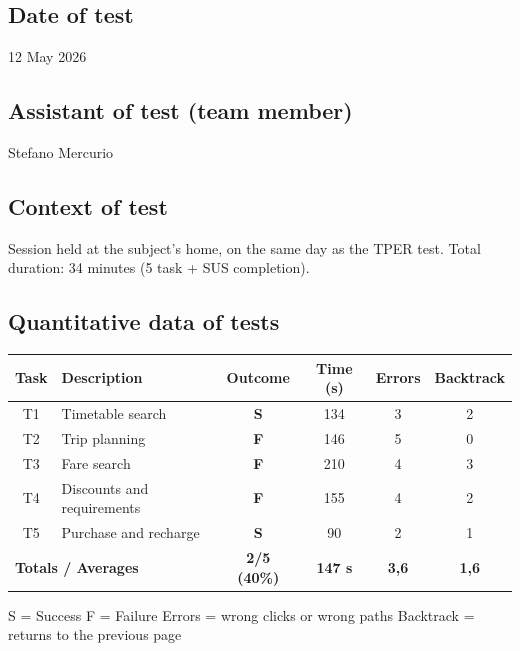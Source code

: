 ﻿\documentclass[11pt,a4paper]{article}
\begin{document}
\subsection*{Date of test}
\begin{tcolorbox}[base]
12 May 2026
\end{tcolorbox}

\subsection*{Assistant of test (team member)}
\begin{tcolorbox}[base]
Stefano Mercurio
\end{tcolorbox}

\subsection*{Context of test}
\begin{tcolorbox}[base]
Session held at the subject's home, on the same day as the TPER test. Total duration: 34 minutes (5 task +
SUS completion).
\end{tcolorbox}

\subsection*{Quantitative data of tests}
\begin{tcolorbox}[base]
\begin{center}
\renewcommand{\arraystretch}{1.4}
\begin{tabular}{clcccc}
\toprule
\textbf{Task} & \textbf{Description} &
\textbf{Outcome} & \textbf{Time (s)} &
\textbf{Errors} & \textbf{Backtrack} \\
\midrule
T1 & Timetable search             & \textbf{S} & 134 & 3 & 2 \\
T2 & Trip planning & \textbf{F} & 146 & 5 & 0 \\
T3 & Fare search           & \textbf{F} & 210 & 4 & 3 \\
T4 & Discounts and requirements  & \textbf{F} & 155 & 4 & 2 \\
T5 & Purchase and recharge       & \textbf{S} & 90 & 2 & 1 \\
\midrule
\multicolumn{2}{l}{\textbf{Totals / Averages}} &
\textbf{2/5 (40\%)} & \textbf{147 s} &
\textbf{3,6} & \textbf{1,6} \\
\bottomrule
\end{tabular}
\end{center}
\vspace{0.3cm}
\small S = Success \quad F = Failure \quad
Errors = wrong clicks or wrong paths \quad
Backtrack = returns to the previous page
\end{tcolorbox}
\end{document}
